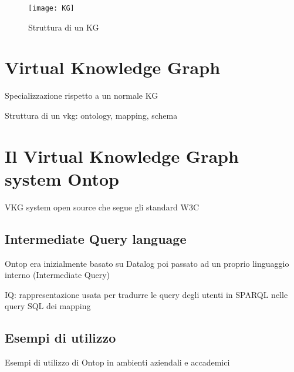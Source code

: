 \begin{figure}[h]
    \centering
    \texttt{[image: KG]}
    \caption{Struttura di un KG}
    \label{fig:KG}
\end{figure}


\section{Virtual Knowledge Graph}
\label{sec:vkg_description}
Specializzazione rispetto a un normale KG

Struttura di un vkg: ontology, mapping, schema

\section{Il Virtual Knowledge Graph system Ontop}
\label{sec:vkg_ontop}
VKG system open source che segue gli standard W3C 

\subsection{Intermediate Query language}
Ontop era inizialmente basato su Datalog poi passato ad un proprio linguaggio interno (Intermediate Query)

IQ: rappresentazione usata per tradurre le query degli utenti in SPARQL nelle query SQL dei mapping

\subsection{Esempi di utilizzo}
Esempi di utilizzo di Ontop in ambienti aziendali e accademici


